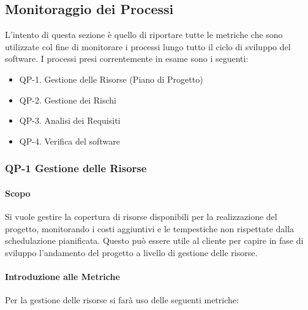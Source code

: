 

\subsection{Monitoraggio dei Processi}

L'intento di questa sezione è quello di riportare tutte le metriche che sono utilizzate col fine di monitorare i processi lungo tutto il ciclo di sviluppo del software. I processi presi correntemente in esame sono i seguenti:

\begin{itemize}
	\item QP-1. Gestione delle Risorse (Piano di Progetto)
	\item QP-2. Gestione dei Rischi
	\item QP-3. Analisi dei Requisiti
	\item QP-4. Verifica del software
\end{itemize}

	\subsubsection{QP-1 Gestione delle Risorse}

		\paragraph{Scopo}

		Si vuole gestire la copertura di risorse disponibili per la realizzazione del progetto, monitorando i costi aggiuntivi e le tempestiche non rispettate dalla schedulazione pianificata. Questo può essere utile al cliente per capire in fase di sviluppo l'andamento del progetto a livello di gestione delle risorse.

		\paragraph{Introduzione alle Metriche}

		Per la gestione delle risorse si farà uso delle seguenti metriche:

